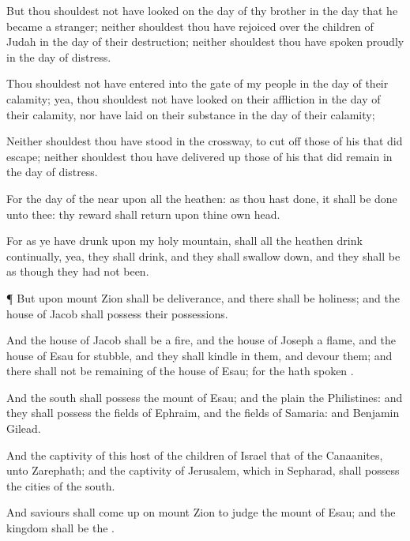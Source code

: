 {But thou shouldest not have
looked on the
day of thy
brother in the
day that he became a
stranger; neither shouldest thou have
rejoiced over the
children of
Judah in the
day of their
destruction; neither shouldest thou have
spoken
proudly in the
day of
distress.

Thou shouldest not have
entered into the
gate of my
people in the
day of their
calamity; yea, thou shouldest not have
looked on their
affliction in the
day of their
calamity, nor have
laid
{} on their
substance in the
day of their
calamity;

Neither shouldest thou have
stood in the
crossway, to cut
off those of his that did
escape; neither shouldest thou have delivered
up those of his that did
remain in the
day of
distress.

For the
day of the
{}
{}
near upon all the
heathen: as thou hast
done, it shall be
done unto thee: thy
reward shall
return upon thine own
head.

For as ye have
drunk upon my
holy
mountain,
{} shall all the
heathen
drink
continually, yea, they shall
drink, and they shall swallow
down, and they shall be as though they had
not been.


\par }{\PP {}¶ But upon
mount
Zion shall be
deliverance, and there shall be
holiness; and the
house of
Jacob shall
possess their
possessions.

And the
house of
Jacob shall be a
fire, and the
house of
Joseph a
flame, and the
house of
Esau for
stubble, and they shall
kindle in them, and
devour them; and there shall not be
{}
remaining of the
house of
Esau; for the
{} hath
spoken
{}.

And
{} the
south shall
possess the
mount of
Esau; and
{} the
plain the
Philistines: and they shall
possess the
fields of
Ephraim, and the
fields of
Samaria: and
Benjamin
{}
Gilead.

And the
captivity of this
host of the
children of
Israel
{} that of the
Canaanites,
{} unto
Zarephath; and the
captivity of
Jerusalem, which
{} in
Sepharad, shall
possess the
cities of the
south.

And
saviours shall come
up on
mount
Zion to
judge the
mount of
Esau; and the
kingdom shall be the
{}.


\par }